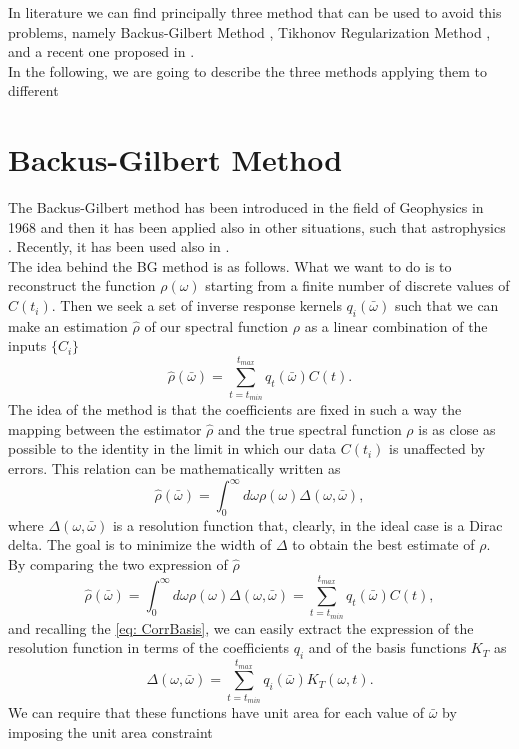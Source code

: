 \documentclass[a4paper,10pt]{article}
\begin{document}
In literature we can find principally three method that can be used to avoid this problems, namely Backus-Gilbert Method \cite{BG}, Tikhonov Regularization Method \cite{TR}, and a recent one proposed in \cite{Nazario}.\\
In the following, we are going to describe the three methods applying them to different 


\section{Backus-Gilbert Method}

The Backus-Gilbert method \cite{BG} has been introduced in the field of Geophysics in 1968  and then it has been applied also in other situations, such that astrophysics \cite{LoredoEpstein}. Recently, it has been used also in  \cite{Hansen}\cite{Brandt2015}\cite{Brandt2016}.\\
The idea behind the BG method is as follows. What we want to do is to reconstruct the function $\rho(\omega)$ starting from a finite number of discrete values of $C(t_i)$. Then we seek a set of inverse response kernels $q_i(\bar{\omega})$ such that we can make an estimation $\hat{\rho}$ of our spectral function $\rho$ as a linear combination of the inputs $\{C_i\}$ 
\begin{equation}
\hat{\rho}(\bar{\omega}) = \sum_{t=t_{min}}^{t_{max}} q_t(\bar{\omega})C(t). 
\end{equation}
The idea of the method is that the coefficients are fixed in such a way the mapping between the estimator $\hat{\rho}$ and the true spectral function $\rho$ is as close as possible to the identity in the limit in which our data $C(t_i)$ is unaffected by errors. This relation can be mathematically written as
\begin{equation}\label{Delta_est}
\hat{\rho}(\bar{\omega}) = \int_0^\infty d\omega \rho(\omega)\Delta(\omega, \bar{\omega}),
\end{equation}
where $\Delta(\omega, \bar{\omega})$ is a resolution function that, clearly, in the ideal case is a Dirac delta. The goal is to minimize the width of $\Delta$ to obtain the best estimate of $\rho$. By comparing the two expression of $\hat{\rho}$ 
\begin{equation}
\hat{\rho}(\bar{\omega}) = \int_0^\infty d\omega \rho(\omega)\Delta(\omega, \bar{\omega}) = \sum_{t=t_{min}}^{t_{max}} q_t(\bar{\omega})C(t), 
\end{equation}
and recalling the \eqref{eq: CorrBasis},  we can easily extract the expression of the resolution function in terms of the coefficients $q_i$ and of the basis functions $K_T$ as 
\begin{equation}\label{eq: res_sum}
\Delta(\omega,\bar{\omega}) = \sum_{t=t_{min}}^{t_{max}} q_i(\bar{\omega}) K_T(\omega,t).
\end{equation}
We can require that these functions have unit area for each value of $\bar{\omega}$  by imposing the unit area constraint
\end{document}
